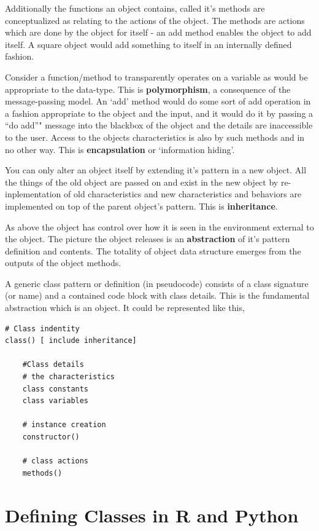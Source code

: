 \documentclass[]{book}
\theoremstyle{definition}
\theoremstyle{definition}
\theoremstyle{definition}
\theoremstyle{remark}
\begin{document}
Additionally the functions an object contains, called it's methods are
conceptualized as relating to the actions of the object. The methods are
actions which are done by the object for itself - an add method enables
the object to add itself. A square object would add something to itself
in an internally defined fashion.

Consider a function/method to transparently operates on a variable as
would be appropriate to the data-type. This is \textbf{polymorphism}, a
consequence of the message-passing  model. An
`add' method would do some sort of add operation in a fashion
appropriate to the object and the input, and it would do it by passing a
``do add''" message into the blackbox of the object and the details are
inaccessible to the user. Access to the objects characteristics is also
by such methods and in no other way. This is \textbf{encapsulation} or
`information hiding'.

You can only alter an object itself by extending it's pattern in a new
object. All the things of the old object are passed on and exist in the
new object by re-inplementation of old characteristics and new
characteristics and behaviors are implemented on top of the parent
object's pattern. This is \textbf{inheritance}.

As above the object has control over how it is seen in the environment
external to the object. The picture the object releases is an
\textbf{abstraction} of it's pattern definition and contents. The
totality of object data structure emerges from the outputs of the object
methods.

A generic class pattern or definition (in
pseudocode) consists of a class signature (or name) and a contained code
block with class details. This is the fundamental abstraction which is
an object. It could be represented like this,

\begin{verbatim}
# Class indentity
class() [ include inheritance]

    #Class details
    # the characteristics
    class constants 
    class variables
  
    # instance creation
    constructor()
    
    # class actions
    methods()
\end{verbatim}

\section{Defining Classes in R and
Python}\label{defining-classes-in-r-and-python}
\end{document}
